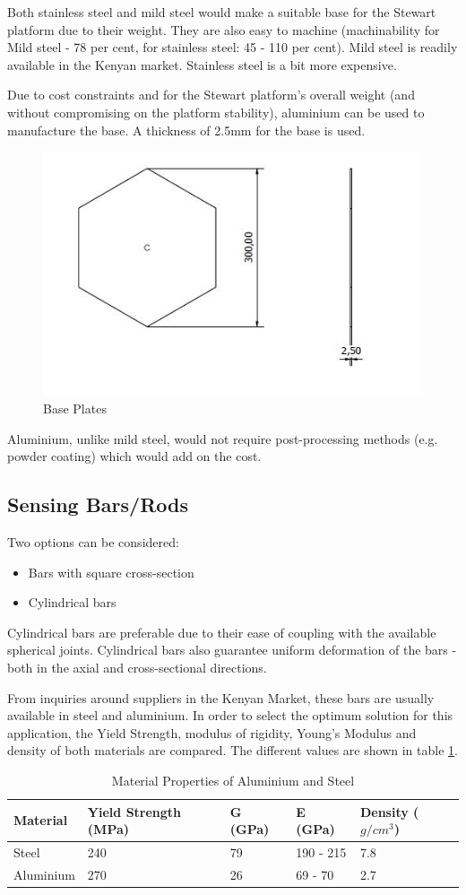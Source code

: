 Both stainless steel and mild steel would make a suitable base for the Stewart platform due to their weight. They are also easy to machine (machinability for Mild steel - 78 per cent, for stainless steel: 45 - 110 per cent). Mild steel is readily available in the Kenyan market. Stainless steel is a bit more expensive.

Due to cost constraints and for the Stewart platform's overall weight (and without compromising on the platform stability), aluminium can be used to manufacture the base. A thickness of 2.5mm for the base is used.
\begin{center}
	\begin{figure}[H]
	\centering
	\includegraphics[width=0.6\linewidth]{Figures/Base}
	\caption[Base Plates]{Base Plates}
	\end{figure}
\end{center}
Aluminium, unlike mild steel, would not require post-processing methods (e.g. powder coating) which would add on the cost.
\subsection{Sensing Bars/Rods}
Two options can be considered:
\begin{itemize}
\item Bars with square cross-section
\item Cylindrical bars
\end{itemize}
Cylindrical bars are preferable due to their ease of coupling with the available spherical joints. Cylindrical bars also guarantee uniform deformation of the bars - both in the axial and cross-sectional directions.

From inquiries around suppliers in the Kenyan Market, these bars are usually available in steel and aluminium. In order to select the optimum solution for this application, the Yield Strength, modulus of rigidity, Young's Modulus and density of both materials are compared. The different values are shown in table \ref{tabmat}. 
\begin{table}[!h]
\caption[Aluminium and Steel Properties]{Material Properties of Aluminium and Steel}
\label{tabmat}

\begin{tabular}{|l|l|l|l|l|}
\hline
\textbf{Material} & \textbf{Yield Strength (MPa)} & \textbf{G (GPa)} & \textbf{E (GPa)} & \textbf{Density ($g/cm^3$)}\\
\hline
Steel & 240 & 79 & 190 - 215 & 7.8\\
\hline
Aluminium & 270 & 26 & 69 - 70 & 2.7\\
\hline
\end{tabular}
\end{table}


